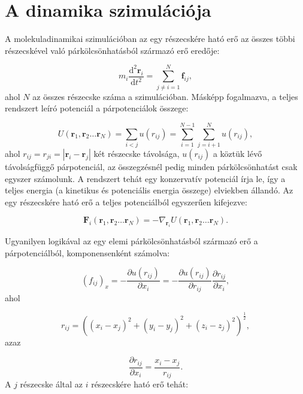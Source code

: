 \documentclass[12pt]{article}
\theoremstyle{plain}
\newcommand{\dd}{\textrm{d}}
\begin{document}
\section{A dinamika szimulációja}

A molekuladinamikai szimulációban az egy részecskére ható erő az összes többi részecskével való párkölcsönhatásból származó erő eredője:

\begin{equation}
	m_i \frac{\dd^2 \mathbf{r}_i}{\dd t^2} = \sum_{j \neq i =1}^{N} \mathbf{f}_{ij},
\end{equation}
ahol $N$ az összes részecske száma a szimulációban. Másképp fogalmazva, a teljes rendszert leíró potenciál a párpotenciálok összege:

\begin{equation}
	U(\mathbf{r}_1, \mathbf{r}_2 \dots \mathbf{r}_N) = \sum_{i<j} u(r_{ij}) = 
	\sum_{i=1}^{N-1} \sum_{j=i+1}^{N} u(r_{ij}),
\end{equation}
ahol $r_{ij} = r_{ji} = |\mathbf{r}_i - \mathbf{r}_j|$ két részecske távolsága, $u(r_{ij})$ a köztük lévő távolságfüggő párpotenciál, az összegzésnél pedig minden párkölcsönhatást csak egyszer számolunk. A rendszert tehát egy konzervatív potenciál írja le, így a teljes energia (a kinetikus és potenciális energia összege) elviekben állandó. Az egy részecskére ható erő a teljes potenciálból egyszerűen kifejezve:

\begin{equation}
	\mathbf{F}_i (\mathbf{r}_1, \mathbf{r}_2 \dots \mathbf{r}_N) = -\nabla_{\mathbf{r}_i} U(\mathbf{r}_1, \mathbf{r}_2 \dots \mathbf{r}_N).
\end{equation}

Ugyanilyen logikával az egy elemi párkölcsönhatásból származó erő a párpotenciálból, komponensenként számolva:

\begin{equation}
	(f_{ij})_x = -\frac{\partial u(r_{ij})}{\partial x_i} = -\frac{\partial u(r_{ij})}{\partial r_{ij}} \frac{\partial r_{ij}}{\partial x_i},
\end{equation}
ahol 

\begin{equation}
	r_{ij} = ( (x_i - x_j)^2 + (y_i - y_j)^2 + (z_i - z_j)^2 )^{\frac{1}{2}},
\end{equation}
azaz

\begin{equation}
	\frac{\partial r_{ij}}{\partial x_i} = \frac{x_i - x_j}{r_{ij}}.
\end{equation}
A $j$ részecske által az $i$ részecskére ható erő tehát:
\end{document}
